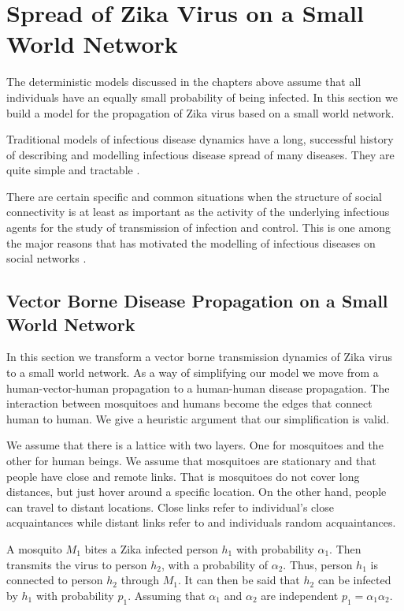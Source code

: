 \chapter{ Spread of Zika Virus on a Small World Network }

The deterministic models discussed in the chapters above assume that all individuals have an equally small probability of being infected. In this section we build a model for the propagation of Zika virus based on a small world network.

Traditional models of infectious disease dynamics have a long, successful history of describing and modelling infectious disease spread of many diseases. They are quite simple and tractable \citep{fu2013propagation}.

There are certain specific and common situations when the structure of social connectivity is at least as important as the  activity of the underlying infectious agents for the study of transmission of infection and control. This is one among the major reasons that has motivated the modelling of infectious diseases on social networks \cite{fu2013propagation}.



\section{ Vector Borne Disease Propagation on a Small World Network}

In this section we transform a vector borne transmission dynamics of Zika virus to a small world network. As a way of simplifying our model we move from a human-vector-human propagation to a human-human disease propagation. The interaction between mosquitoes and humans become the edges that connect human to human. We give a heuristic argument that our simplification is valid.

We assume that there is a lattice with two layers. One for mosquitoes and the other for human beings. We assume that mosquitoes are stationary and that people have close and remote links. That is mosquitoes do not cover long distances, but just hover around a specific location.
On the other hand, people can travel to distant locations. Close links refer to individual's close acquaintances while distant links refer to and individuals random acquaintances.
 
A mosquito $M_1$ bites a Zika infected person $h_1$ with probability $\alpha_1$. Then transmits the virus to person $h_2$, with a probability of $\alpha_2$. Thus, person $h_1$ is connected to  person $h_2$ through $M_1$. It can then be said that $h_2$ can be infected by $h_1$ with probability $p_1$. Assuming that $\alpha_1 $ and $\alpha_2$ are independent  $p_1 =  \alpha_1 \alpha_2$. 

